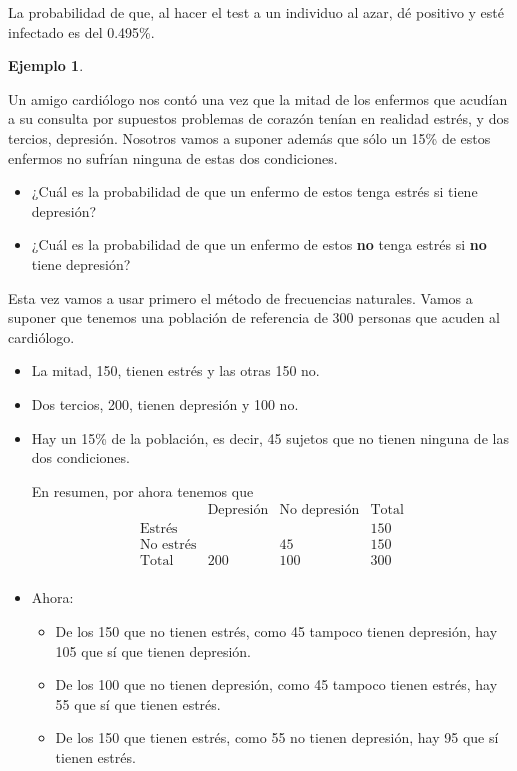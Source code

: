 \documentclass[
]{book}
\providecommand{\tightlist}{%
  \setlength{\itemsep}{0pt}\setlength{\parskip}{0pt}}
\theoremstyle{definition}
\theoremstyle{definition}
\newtheorem{example}{Ejemplo}[chapter]
\theoremstyle{definition}
\theoremstyle{definition}
\theoremstyle{remark}
\begin{document}
La probabilidad de que, al hacer el test a un individuo al azar, dé positivo y esté infectado es del 0.495\%.

\begin{example}
\protect\hypertarget{exm:triola}{}\label{exm:triola}

Un amigo cardiólogo nos contó una vez que la mitad de los enfermos que acudían a su consulta por supuestos problemas de corazón tenían en realidad estrés, y dos tercios, depresión. Nosotros vamos a suponer además que sólo un 15\% de estos enfermos no sufrían ninguna de estas dos condiciones.

\begin{itemize}
\tightlist
\item
  ¿Cuál es la probabilidad de que un enfermo de estos tenga estrés si tiene depresión?
\item
  ¿Cuál es la probabilidad de que un enfermo de estos \textbf{no} tenga estrés si \textbf{no} tiene depresión?
\end{itemize}

\end{example}

Esta vez vamos a usar primero el método de frecuencias naturales. Vamos a suponer que tenemos una población de referencia de 300 personas que acuden al cardiólogo.

\begin{itemize}
\item
  La mitad, 150, tienen estrés y las otras 150 no.
\item
  Dos tercios, 200, tienen depresión y 100 no.
\item
  Hay un 15\% de la población, es decir, 45 sujetos que no tienen ninguna de las dos condiciones.

  En resumen, por ahora tenemos que
  \[
  \begin{array}{r|c|c|c}
  & \text{Depresión} & \text{No depresión} & \text{Total}\\ \hline
  \text{Estrés} & &  & 150 \\ \hline
  \text{No estrés} &   & 45 & 150 \\ \hline
  \text{Total} &  200 & 100 & 300\\ 
  \end{array}
  \]
\item
  Ahora:

  \begin{itemize}
  \tightlist
  \item
    De los 150 que no tienen estrés, como 45 tampoco tienen depresión, hay 105 que sí que tienen depresión.
  \item
    De los 100 que no tienen depresión, como 45 tampoco tienen estrés, hay 55 que sí que tienen estrés.
  \item
    De los 150 que tienen estrés, como 55 no tienen depresión, hay 95 que sí tienen estrés.
  \end{itemize}
\end{itemize}
\end{document}
